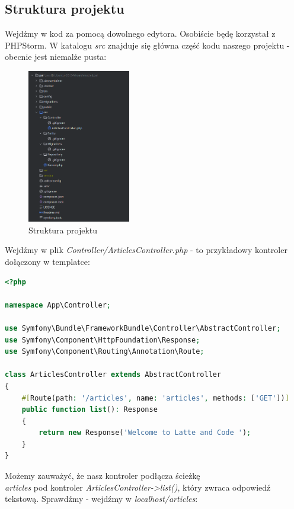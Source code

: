 \documentclass[polish, a4paper]{article}
\begin{document}
\subsection{Struktura projektu}

Wejdźmy w kod za pomocą dowolnego edytora. Osobiście będę korzystał z PHPStorm. W katalogu \emph{src} znajduje się główna część kodu naszego projektu - obecnie jest niemalże pusta:

\begin{figure}[H]
  \centering
  \includegraphics[width=0.4\textwidth]{struktura.png}
  \caption{Struktura projektu}
\end{figure}

Wejdźmy w plik \emph{Controller/ArticlesController.php} - to przykładowy kontroler dołączony w templatce:

\begin{lstlisting}[language=PHP, caption=Controller/ArticlesController.php]
<?php

namespace App\Controller;

use Symfony\Bundle\FrameworkBundle\Controller\AbstractController;
use Symfony\Component\HttpFoundation\Response;
use Symfony\Component\Routing\Annotation\Route;

class ArticlesController extends AbstractController
{
    #[Route(path: '/articles', name: 'articles', methods: ['GET'])]
    public function list(): Response
    {
        return new Response('Welcome to Latte and Code ');
    }
}
\end{lstlisting}

Możemy zauważyć, że nasz kontroler podłącza ścieżkę \emph{\\articles} pod kontroler \emph{ArticlesController->list()}, który zwraca odpowiedź tekstową. Sprawdźmy - wejdźmy w \emph{localhost/articles}:
\end{document}
